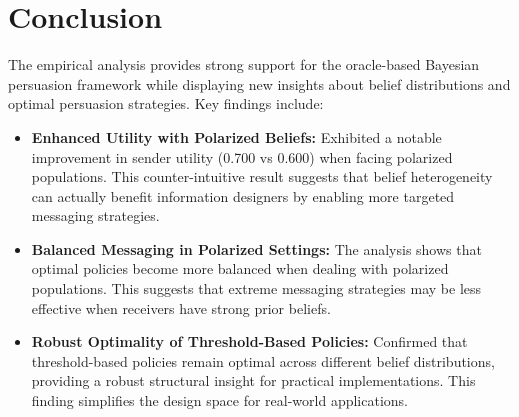\documentclass[12pt]{article}
\theoremstyle{plain}
\theoremstyle{definition}
\theoremstyle{remark}
\begin{document}
\section{Conclusion}

The empirical analysis provides strong support for the oracle-based Bayesian persuasion framework while displaying new insights about belief distributions and optimal persuasion strategies. Key findings include:

\begin{itemize}
    \item \textbf{Enhanced Utility with Polarized Beliefs:} Exhibited a notable improvement in sender utility (0.700 vs 0.600) when facing polarized populations. This counter-intuitive result suggests that belief heterogeneity can actually benefit information designers by enabling more targeted messaging strategies.
    
    \item \textbf{Balanced Messaging in Polarized Settings:} The analysis shows that optimal policies become more balanced when dealing with polarized populations. This suggests that extreme messaging strategies may be less effective when receivers have strong prior beliefs.
    
    \item \textbf{Robust Optimality of Threshold-Based Policies:} Confirmed that threshold-based policies remain optimal across different belief distributions, providing a robust structural insight for practical implementations. This finding simplifies the design space for real-world applications.
\end{itemize}
\end{document}
